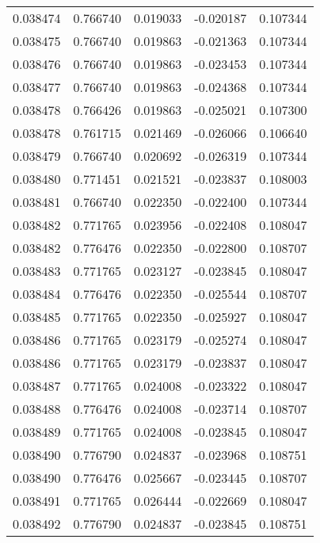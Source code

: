 \begin{tabular}{lrrrr}
0.038474    &  0.766740 &  0.019033 & -0.020187 &             0.107344 \\
0.038475    &  0.766740 &  0.019863 & -0.021363 &             0.107344 \\
0.038476    &  0.766740 &  0.019863 & -0.023453 &             0.107344 \\
0.038477    &  0.766740 &  0.019863 & -0.024368 &             0.107344 \\
0.038478    &  0.766426 &  0.019863 & -0.025021 &             0.107300 \\
0.038478    &  0.761715 &  0.021469 & -0.026066 &             0.106640 \\
0.038479    &  0.766740 &  0.020692 & -0.026319 &             0.107344 \\
0.038480    &  0.771451 &  0.021521 & -0.023837 &             0.108003 \\
0.038481    &  0.766740 &  0.022350 & -0.022400 &             0.107344 \\
0.038482    &  0.771765 &  0.023956 & -0.022408 &             0.108047 \\
0.038482    &  0.776476 &  0.022350 & -0.022800 &             0.108707 \\
0.038483    &  0.771765 &  0.023127 & -0.023845 &             0.108047 \\
0.038484    &  0.776476 &  0.022350 & -0.025544 &             0.108707 \\
0.038485    &  0.771765 &  0.022350 & -0.025927 &             0.108047 \\
0.038486    &  0.771765 &  0.023179 & -0.025274 &             0.108047 \\
0.038486    &  0.771765 &  0.023179 & -0.023837 &             0.108047 \\
0.038487    &  0.771765 &  0.024008 & -0.023322 &             0.108047 \\
0.038488    &  0.776476 &  0.024008 & -0.023714 &             0.108707 \\
0.038489    &  0.771765 &  0.024008 & -0.023845 &             0.108047 \\
0.038490    &  0.776790 &  0.024837 & -0.023968 &             0.108751 \\
0.038490    &  0.776476 &  0.025667 & -0.023445 &             0.108707 \\
0.038491    &  0.771765 &  0.026444 & -0.022669 &             0.108047 \\
0.038492    &  0.776790 &  0.024837 & -0.023845 &             0.108751 \\

\end{tabular}
